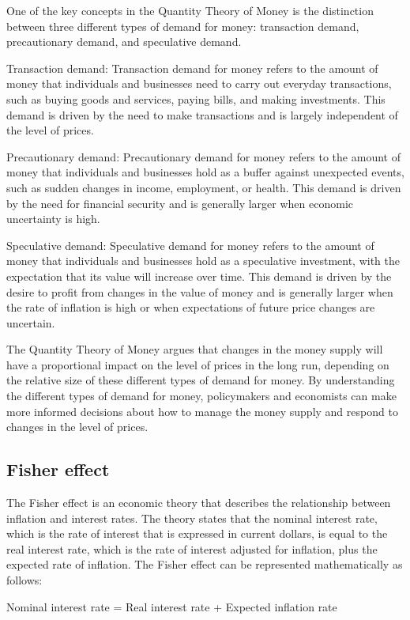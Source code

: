 \documentclass[12pt, a4paper, oneside]{article}
\begin{document}
One of the key concepts in the Quantity Theory of Money is the distinction between three different types of demand for money: transaction demand, precautionary demand, and speculative demand.

Transaction demand: Transaction demand for money refers to the amount of money that individuals and businesses need to carry out everyday transactions, such as buying goods and services, paying bills, and making investments. This demand is driven by the need to make transactions and is largely independent of the level of prices.

Precautionary demand: Precautionary demand for money refers to the amount of money that individuals and businesses hold as a buffer against unexpected events, such as sudden changes in income, employment, or health. This demand is driven by the need for financial security and is generally larger when economic uncertainty is high.

Speculative demand: Speculative demand for money refers to the amount of money that individuals and businesses hold as a speculative investment, with the expectation that its value will increase over time. This demand is driven by the desire to profit from changes in the value of money and is generally larger when the rate of inflation is high or when expectations of future price changes are uncertain.

The Quantity Theory of Money argues that changes in the money supply will have a proportional impact on the level of prices in the long run, depending on the relative size of these different types of demand for money. By understanding the different types of demand for money, policymakers and economists can make more informed decisions about how to manage the money supply and respond to changes in the level of prices.
\subsection{ Fisher effect }
The Fisher effect is an economic theory that describes the relationship between inflation and interest rates. The theory states that the nominal interest rate, which is the rate of interest that is expressed in current dollars, is equal to the real interest rate, which is the rate of interest adjusted for inflation, plus the expected rate of inflation. The Fisher effect can be represented mathematically as follows:

Nominal interest rate = Real interest rate + Expected inflation rate
\end{document}
